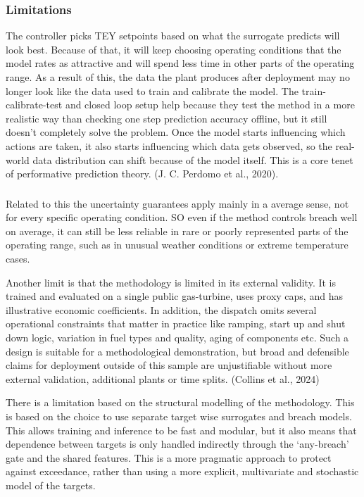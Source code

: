 \documentclass[11pt]{article}
\begin{document}
\subsubsection{Limitations}\label{limitations}

The controller picks TEY setpoints based on what the surrogate predicts
will look best. Because of that, it will keep choosing operating
conditions that the model rates as attractive and will spend less time
in other parts of the operating range. As a result of this, the data the
plant produces after deployment may no longer look like the data used to
train and calibrate the model. The train-calibrate-test and closed loop
setup help because they test the method in a more realistic way than
checking one step prediction accuracy offline, but it still doesn't
completely solve the problem. Once the model starts influencing which
actions are taken, it also starts influencing which data gets observed,
so the real-world data distribution can shift because of the model
itself. This is a core tenet of performative prediction theory. (J. C.
Perdomo et al., 2020).

\subsubsection{}\label{section-9}

Related to this the uncertainty guarantees apply mainly in a average
sense, not for every specific operating condition. SO even if the method
controls breach well on average, it can still be less reliable in rare
or poorly represented parts of the operating range, such as in unusual
weather conditions or extreme temperature cases.

Another limit is that the methodology is limited in its external
validity. It is trained and evaluated on a single public gas-turbine,
uses proxy caps, and has illustrative economic coefficients. In
addition, the dispatch omits several operational constraints that matter
in practice like ramping, start up and shut down logic, variation in
fuel types and quality, aging of components etc. Such a design is
suitable for a methodological demonstration, but broad and defensible
claims for deployment outside of this sample are unjustifiable without
more external validation, additional plants or time splits. (Collins et
al., 2024)

There is a limitation based on the structural modelling of the
methodology. This is based on the choice to use separate target wise
surrogates and breach models. This allows training and inference to be
fast and modular, but it also means that dependence between targets is
only handled indirectly through the `any-breach' gate and the shared
features. This is a more pragmatic approach to protect against
exceedance, rather than using a more explicit, multivariate and
stochastic model of the targets.
\end{document}
